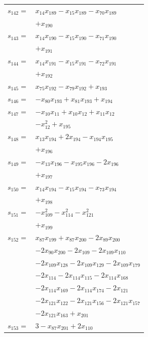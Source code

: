 \begin{longtable}{@{}r@{\;}l@{}}
\(s_{142}=\) & \(\displaystyle x_{14}x_{189} -x_{15}x_{189} -x_{70}x_{189}\) \\
 & \(\displaystyle +x_{190}\) \\[3pt]
\(s_{143}=\) & \(\displaystyle x_{14}x_{190} -x_{15}x_{190} -x_{71}x_{190}\) \\
 & \(\displaystyle +x_{191}\) \\[3pt]
\(s_{144}=\) & \(\displaystyle x_{14}x_{191} -x_{15}x_{191} -x_{72}x_{191}\) \\
 & \(\displaystyle +x_{192}\) \\[3pt]
\(s_{145}=\) & \(\displaystyle x_{75}x_{192} -x_{79}x_{192} +x_{193}\) \\[3pt]
\(s_{146}=\) & \(\displaystyle -x_{80}x_{193} +x_{81}x_{193} +x_{194}\) \\[3pt]
\(s_{147}=\) & \(\displaystyle -x_{10}x_{11} +x_{10}x_{12} +x_{11}x_{12}\) \\
 & \(\displaystyle -x_{12}^{2} +x_{195}\) \\[3pt]
\(s_{148}=\) & \(\displaystyle x_{13}x_{194} +2x_{194} -x_{194}x_{195}\) \\
 & \(\displaystyle +x_{196}\) \\[3pt]
\(s_{149}=\) & \(\displaystyle -x_{13}x_{196} -x_{195}x_{196} -2x_{196}\) \\
 & \(\displaystyle +x_{197}\) \\[3pt]
\(s_{150}=\) & \(\displaystyle x_{14}x_{194} -x_{15}x_{194} -x_{73}x_{194}\) \\
 & \(\displaystyle +x_{198}\) \\[3pt]
\(s_{151}=\) & \(\displaystyle -x_{109}^{2} -x_{114}^{2} -x_{121}^{2}\) \\
 & \(\displaystyle +x_{199}\) \\[3pt]
\(s_{152}=\) & \(\displaystyle x_{87}x_{199} +x_{87}x_{200} -2x_{89}x_{200}\) \\
 & \(\displaystyle -2x_{90}x_{200} -2x_{109} -2x_{109}x_{110}\) \\
 & \(\displaystyle -2x_{109}x_{128} -2x_{109}x_{129} -2x_{109}x_{179}\) \\
 & \(\displaystyle -2x_{114} -2x_{114}x_{115} -2x_{114}x_{168}\) \\
 & \(\displaystyle -2x_{114}x_{169} -2x_{114}x_{174} -2x_{121}\) \\
 & \(\displaystyle -2x_{121}x_{122} -2x_{121}x_{156} -2x_{121}x_{157}\) \\
 & \(\displaystyle -2x_{121}x_{163} +x_{201}\) \\[3pt]
\(s_{153}=\) & \(\displaystyle 3 -x_{87}x_{201} +2x_{110}\) \\

\end{longtable}
